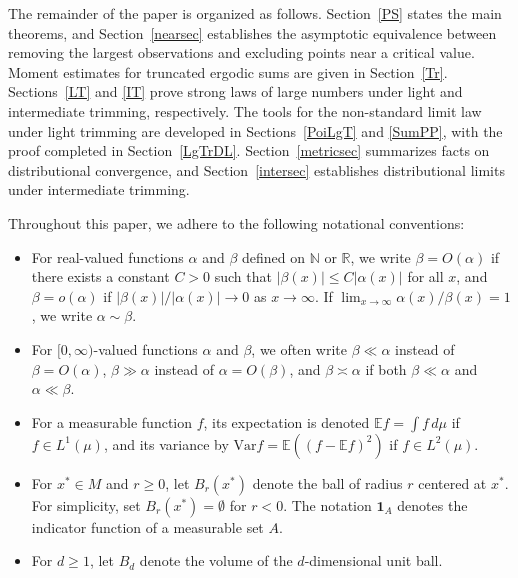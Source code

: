 \documentclass[11pt,twoside,a4paper,reqno]{amsart}
\begin{document}
The remainder of the paper is organized as follows. Section~\ref{PS} states the main theorems, and Section~\ref{nearsec} establishes the asymptotic equivalence between removing the largest observations and excluding points near a critical value. Moment estimates for truncated ergodic sums are given in Section~\ref{Tr}. Sections~\ref{LT} and \ref{IT} prove strong laws of large numbers under light and intermediate trimming, respectively. The tools for the non-standard limit law under light trimming are developed in Sections~\ref{PoiLgT} and \ref{SumPP}, with the proof completed in Section~\ref{LgTrDL}. Section~\ref{metricsec} summarizes facts on distributional convergence, and Section~\ref{intersec} establishes distributional limits under intermediate trimming.


Throughout this paper, we adhere to the following notational conventions:
\begin{itemize}
\item[$\bullet$] For real-valued functions $\alpha$ and $\beta$ defined on $\mathbb{N}$ or $\mathbb{R}$, we write $\beta = O(\alpha)$ if there exists a constant $C>0$ such that $|\beta(x)| \leq C |\alpha(x)|$ for all $x$, and $\beta=o(\alpha)$ if $|\beta(x)|/|\alpha(x)| \to 0$ as $x \to \infty$. If $\lim_{x\to\infty} \alpha(x)/\beta(x) = 1$, we write $\alpha \sim \beta$.

\item[$\bullet$] For $[0,\infty)$-valued functions $\alpha$ and $\beta$, we often write $\beta \ll \alpha$ instead of $\beta=O(\alpha)$, $\beta \gg \alpha$ instead of $\alpha=O(\beta)$, and $\beta \asymp \alpha$ if both $\beta \ll \alpha$ and $\alpha \ll \beta$.

\item[$\bullet$] For a measurable function $f$, its expectation is denoted $\mathbb{E} f = \int f \, d\mu$ if $f \in L^1(\mu)$, and its variance by $\mathrm{Var} f = \mathbb{E}((f-\mathbb{E}f)^2)$ if $f \in L^2(\mu)$.

\item[$\bullet$] For $x^* \in M$ and $r \ge 0$, let $B_r(x^*)$ denote the ball of radius $r$ centered at $x^*$. For simplicity, set $B_r(x^*) = \emptyset$ for $r < 0$. The notation $\mathbf{1}_A$ denotes the indicator function of a measurable set $A$.

\item[$\bullet$] For $d \geq 1$, let $B_d$ denote the volume of the $d$-dimensional unit ball.
\end{itemize}
\end{document}
